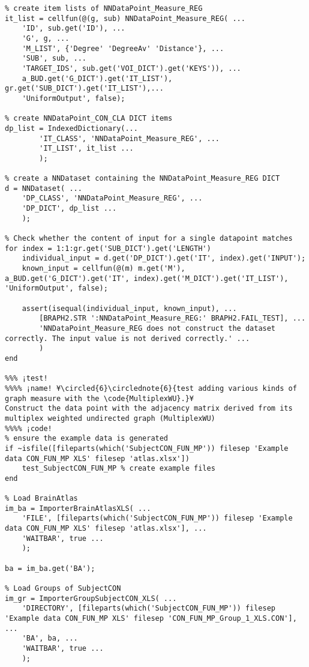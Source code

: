 \documentclass{tufte-handout}
\begin{document}
\begin{lstlisting}
% create item lists of NNDataPoint_Measure_REG
it_list = cellfun(@(g, sub) NNDataPoint_Measure_REG( ...
    'ID', sub.get('ID'), ...
    'G', g, ...
    'M_LIST', {'Degree' 'DegreeAv' 'Distance'}, ...
    'SUB', sub, ...
    'TARGET_IDS', sub.get('VOI_DICT').get('KEYS')), ...
    a_BUD.get('G_DICT').get('IT_LIST'), gr.get('SUB_DICT').get('IT_LIST'),...
    'UniformOutput', false);

% create NNDataPoint_CON_CLA DICT items
dp_list = IndexedDictionary(...
        'IT_CLASS', 'NNDataPoint_Measure_REG', ...
        'IT_LIST', it_list ...
        );

% create a NNDataset containing the NNDataPoint_Measure_REG DICT
d = NNDataset( ...
    'DP_CLASS', 'NNDataPoint_Measure_REG', ...
    'DP_DICT', dp_list ...
    );

% Check whether the content of input for a single datapoint matches
for index = 1:1:gr.get('SUB_DICT').get('LENGTH')
    individual_input = d.get('DP_DICT').get('IT', index).get('INPUT');
    known_input = cellfun(@(m) m.get('M'), a_BUD.get('G_DICT').get('IT', index).get('M_DICT').get('IT_LIST'), 'UniformOutput', false);

    assert(isequal(individual_input, known_input), ...
        [BRAPH2.STR ':NNDataPoint_Measure_REG:' BRAPH2.FAIL_TEST], ...
        'NNDataPoint_Measure_REG does not construct the dataset correctly. The input value is not derived correctly.' ...
        )
end

%%% ¡test!
%%%% ¡name! ¥\circled{6}\circlednote{6}{test adding various kinds of graph measure with the \code{MultiplexWU}.}¥
Construct the data point with the adjacency matrix derived from its multiplex weighted undirected graph (MultiplexWU) 
%%%% ¡code!
% ensure the example data is generated
if ~isfile([fileparts(which('SubjectCON_FUN_MP')) filesep 'Example data CON_FUN_MP XLS' filesep 'atlas.xlsx'])
    test_SubjectCON_FUN_MP % create example files
end

% Load BrainAtlas
im_ba = ImporterBrainAtlasXLS( ...
    'FILE', [fileparts(which('SubjectCON_FUN_MP')) filesep 'Example data CON_FUN_MP XLS' filesep 'atlas.xlsx'], ...
    'WAITBAR', true ...
    );

ba = im_ba.get('BA');

% Load Groups of SubjectCON
im_gr = ImporterGroupSubjectCON_XLS( ...
    'DIRECTORY', [fileparts(which('SubjectCON_FUN_MP')) filesep 'Example data CON_FUN_MP XLS' filesep 'CON_FUN_MP_Group_1_XLS.CON'], ...
    'BA', ba, ...
    'WAITBAR', true ...
    );


\end{lstlisting}
\end{document}
